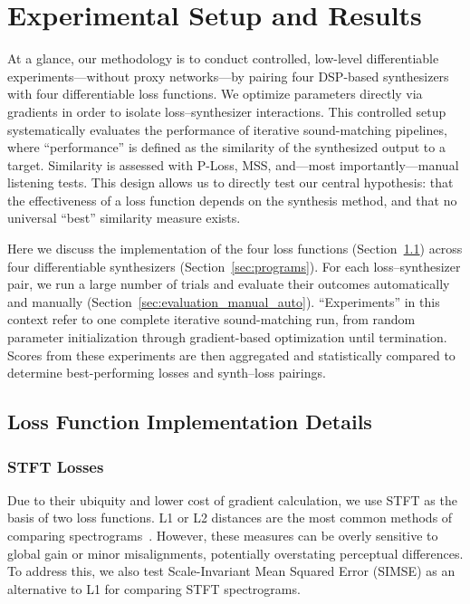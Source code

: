 
\section{Experimental Setup and Results}
\label{sec:experiment_setup}
At a glance, our methodology is to conduct controlled, low-level differentiable experiments—without proxy networks—by pairing four DSP-based synthesizers with four differentiable loss functions. We optimize parameters directly via gradients in order to isolate loss–synthesizer interactions. This controlled setup systematically evaluates the performance of iterative sound-matching pipelines, where “performance” is defined as the similarity of the synthesized output to a target. Similarity is assessed with P-Loss, MSS, and—most importantly—manual listening tests. This design allows us to directly test our central hypothesis: that the effectiveness of a loss function depends on the synthesis method, and that no universal “best” similarity measure exists.

Here we discuss the implementation of the four loss functions (Section~\ref{sec:loss_implementation})
across four differentiable synthesizers (Section~\ref{sec:programs}). For
each loss–synthesizer pair, we run a large number of trials and evaluate
their outcomes automatically and manually
(Section~\ref{sec:evaluation_manual_auto}). ``Experiments'' in this context
refer to one complete iterative sound-matching run, from random parameter
initialization through gradient-based optimization until termination. Scores
from these experiments are then aggregated and statistically compared to
determine best-performing losses and synth–loss pairings.



\subsection{Loss Function Implementation Details}
\label{sec:loss_implementation}
\subsubsection{STFT Losses}
Due to their ubiquity and lower cost of gradient calculation, we use STFT as the basis of two loss functions. 
L1 or L2 distances are the most common methods of comparing spectrograms~\cite{turian2020sorry,richard2025model}. 
However, these measures can be overly sensitive to global gain or minor misalignments, potentially overstating perceptual differences. 
To address this, we also test Scale-Invariant Mean Squared Error (SIMSE) as an alternative to L1 for comparing STFT spectrograms.


